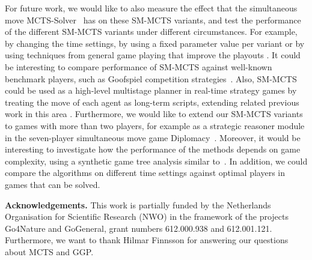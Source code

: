 \documentclass[conference]{IEEEtran}
\begin{document}
For future work, we would like to also measure the effect that the simultaneous move MCTS-Solver~\cite[Chapter 6]{Finnsson12} has on these 
SM-MCTS variants, and test the performance of the different SM-MCTS variants under different circumstances. For example, by changing the time settings, 
by using a fixed parameter value per variant or by using techniques from general game playing that improve the playouts \cite{Bjornsson09CadiaPlayer}.
It could be interesting to compare performance of SM-MCTS against well-known benchmark players, such as Goofspiel competition 
strategies~\cite{Dror13Repeated}.
Also, SM-MCTS could be used as a high-level multistage planner in real-time strategy games by treating the move of each agent
as long-term scripts, extending related previous work in this area \cite{Sailor07adversarial}. 
Furthermore, we would like to extend our SM-MCTS variants to games with more than two players, for example as a strategic reasoner 
module in the seven-player simultaneous move game Diplomacy~\cite{Fabregues11DipGame}.
Moreover, it would be interesting to investigate how the performance of the methods depends on game complexity, using a synthetic game tree 
analysis similar to~\cite{Lisy13Computing}. 
In addition, we could compare the algorithms on different time settings against optimal players in games that can be solved.


{\bf Acknowledgements.} {\small This work is partially funded by the Netherlands Organisation for
Scientific Research (NWO) in the framework of the projects Go4Nature and GoGeneral, grant numbers 
612.000.938 and 612.001.121. Furthermore, we want to thank Hilmar Finnsson for answering our questions about MCTS and GGP.}

%
%
\end{document}
